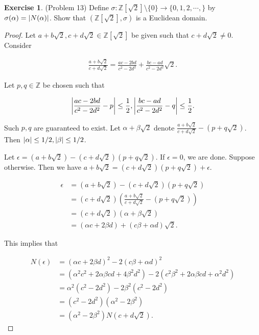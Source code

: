 \documentclass[12pt, psamsfonts]{amsart}
\theoremstyle{definition}
\newtheorem*{exer}{Exercise}
\theoremstyle{remark}
\numberwithin{equation}{section}
\begin{document}
\begin{exer}{(Problem 13)}
  Define $\sigma: \mathbb{Z}[\sqrt{2}] \setminus \{ 0 \} \rightarrow \{ 0, 1, 2, \cdots, \}$ by $\sigma(\alpha) = \abs{N(\alpha)}$.
  Show that $(\mathbb{Z}[\sqrt{2}], \sigma)$ is a Euclidean domain.
\end{exer}

\begin{proof}
  Let $a + b\sqrt{2}, c + d\sqrt{2} \in \mathbb{Z}[\sqrt{2}]$ be given such that $c + d\sqrt{2} \ne 0$.
  Consider

  \begin{align*}
    \frac{a + b\sqrt{2}}{c + d\sqrt{2}} = \frac{ac - 2bd}{c^2 - 2d^2} + \frac{bc - ad}{c^2 - 2d^2}\sqrt{2}.
  \end{align*}

  Let $p, q \in \mathbb{Z}$ be chosen such that

  \begin{align*}
    \abs{\frac{ac - 2bd}{c^2 - 2d^2} - p} \leq \frac{1}{2}, \abs{\frac{bc - ad}{c^2 - 2d^2} - q} \leq \frac{1}{2}.
  \end{align*}

  Such $p, q$ are guaranteed to exist.
  Let $\alpha + \beta\sqrt{2}$ denote $\frac{a + b\sqrt{2}}{c + d\sqrt{2}} - (p + q\sqrt{2})$.
  Then $\abs{\alpha} \leq 1/2, \abs{\beta} \leq 1/2$.

  Let $\epsilon = (a + b\sqrt{2}) - (c + d\sqrt{2})(p + q\sqrt{2})$.
  If $\epsilon = 0$, we are done.
  Suppose otherwise.
  Then we have $a + b\sqrt{2} = (c + d\sqrt{2})(p + q\sqrt{2}) + \epsilon$.

  \begin{align*}
    \epsilon
      &= (a + b\sqrt{2}) - (c + d\sqrt{2})(p + q\sqrt{2}) \\
      &= (c + d\sqrt{2})(\frac{a + b\sqrt{2}}{c + d\sqrt{2}} - (p + q\sqrt{2})) \\
      &= (c + d\sqrt{2})(\alpha + \beta\sqrt{2}) \\
      &= (\alpha c + 2\beta d) + (c\beta + \alpha d)\sqrt{2}.
  \end{align*}

  This implies that

  \begin{align*}
    N(\epsilon)
      &= (\alpha c + 2\beta d)^2 - 2(c\beta + \alpha d)^2 \\
      &= (\alpha^2 c^2 + 2\alpha\beta cd + 4\beta^2d^2) - 2(c^2\beta^2 + 2\alpha\beta cd + \alpha^2 d^2) \\
      &= \alpha^2(c^2 - 2d^2) - 2\beta^2(c^2 - 2d^2) \\
      &= (c^2 - 2d^2)(\alpha^2 - 2\beta^2) \\
      &= (\alpha^2 - 2\beta^2)N(c + d\sqrt{2}).
  \end{align*}


\end{proof}
\end{document}
